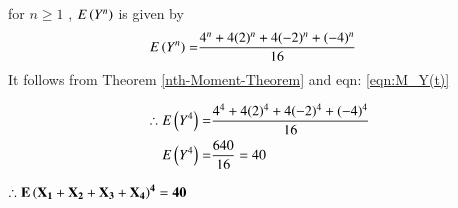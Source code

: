 \documentclass[journal,12pt,twocolumn]{IEEEtran}
\begin{document}
\begin{theorem}
for $n \geq 1$ , $E\left(Y^n\right)$ is given by
\begin{align}
    E\left(Y^n\right)=&\frac{4^n+4(2)^n+4(-2)^n+(-4)^n}{16} 
\end{align}
It follows from Theorem \ref{nth-Moment-Theorem} and eqn: \eqref{eqn:M_Y(t)}
\label{exp_yn}
\end{theorem}


\begin{align}
   \therefore E\left(Y^4\right)=&\frac{4^4+4(2)^4+4(-2)^4+(-4)^4}{16} 
    \\E\left(Y^4\right)=&\frac{640}{16}=40
\end{align}

{\centering
$\mathbf{\therefore E\left(X_1+X_2 +X_3 +X_4\right)^4=40}$

}
\end{document}
